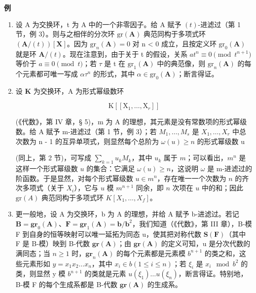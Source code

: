 \textbf{例}\par

\begin{enumerate}
\def\labelenumi{(\arabic{enumi})}
\item
	  设 A 为交换环，t 为 A 中的一个非零因子。给 A 赋予 \((t)\)-进滤过（第 1 节，例 3）。则与之相伴的分次环 \(\mathrm{gr}(\mathbf{A})\) 典范同构于多项式环 \((\mathbf{A}/(t))[\mathbf{X}]\)。因为 \(\mathrm{gr}_{n}(\mathbf{A}) = 0\) 对 n \textless{} 0 成立，且按定义环 \(\mathrm{gr}_{0}(\mathbf{A})\) 就是环 \(\mathbf{A}/(t)\)。现在注意到，由于关于 t 的假设，关系 \(at^{n} \equiv 0 \pmod{t^{n+1}}\) 等价于 \(a \equiv 0 \pmod{t}\)；若 \(\tau\) 是 t 在 \(\mathrm{gr}_{1}(\mathbf{A})\) 中的典范像，则 \(\mathrm{gr}_{n}(\mathbf{A})\) 的每个元素都可唯一写成 \(\alpha\tau^{n}\) 的形式，其中 \(\alpha \in \mathrm{gr}_{0}(\mathbf{A})\)；断言得证。
\item
  设 \(\mathbf{K}\) 为交换环，A 为形式幂级数环

\[
\mathrm{K} \left[ \left[ \mathrm{X} _ {1}, \dots , \mathrm{X} _ {r} \right] \right]
\]

(《代数》，第 IV 章，§ 5)，m 为 A 的理想，其元素是没有常数项的形式幂级数。给 A 赋予 m-进滤过（第 1 节，例 3）；若 \(M_{1}, \ldots, M_{s}\) 是 \(X_{1}, \ldots, X_{r}\) 中总次数为 n - 1 的互异单项式，则显然每个总阶为 \(\omega(u) \geqslant n\) 的形式幂级数 u

	(同上，第 2 节)，可写成 \(\sum_{k=1} u_k M_k\)，其中 \(u_k\) 属于 \(m\)；可以看出，\(m^n\) 是这样一个形式幂级数 \(u\) 的集合：它满足 \(\omega(u) \geqslant n\)，这说明 \(\omega\) 是 m-进滤过的阶函数。于是显然，对每个形式幂级数 \(u \in m^n\)，存在唯一一个次数为 \(n\) 的齐次多项式（关于 \(X_i\)），它与 \(u\) 模 \(m^{n+1}\) 同余，即 \(n\) 次项在 \(u\) 中的和；因此 \(\text{gr}(A)\) 典范同构于多项式环 \(K[X_1, \ldots, X_f]\)。

\item
	  更一般地，设 A 为交换环，b 为 A 的理想，并给 A 赋予 b-进滤过。若记 \(\mathbf{B} = \mathbf{gr}_{0}(\mathbf{A})\)、\(\mathbf{F} = \mathbf{gr}_{1}(\mathbf{A}) = \mathbf{b}/\mathbf{b}^{2}\)，我们知道（《代数》，第 III 章），B-模 F 到自身的恒等映射可以唯一延拓为同态 u，使其把对称代数 \(\mathbf{S}(\mathbf{F})\)（其中 F 是 B-模）映到 B-代数 \(\mathbf{gr}(\mathbf{A})\)；由 \(\mathbf{gr}(\mathbf{A})\) 的定义可知，u 是分次代数的满同态；当 \(n \geqslant 1\) 时，\(\mathbf{gr}_{n}(\mathbf{A})\) 的每个元素都是元素模 \(b^{n+1}\) 的类之和，这些元素形如 \(y = x_{1}x_{2}\ldots x_{n}\)，其中 \(x_{i} \in b (1 \leqslant i \leqslant n)\)；若 \(\xi_{i}\) 是 \(x_{i} \mod b^{2}\) 的类，则显然 y 模 \(b^{n+1}\) 的类就是元素 \(u(\xi_{1})\ldots u(\xi_{n})\)，断言得证。特别地，B-模 F 的每个生成系都是 B-代数 \(\mathbf{gr}(\mathbf{A})\) 的生成系。
\end{enumerate}

